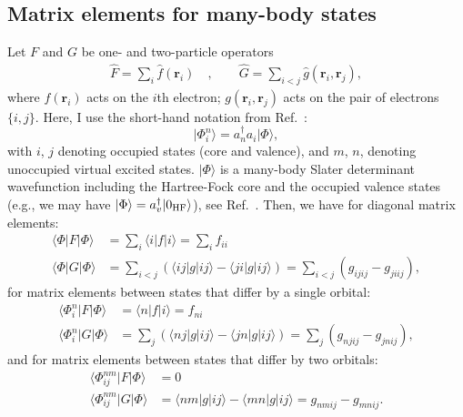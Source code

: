 \documentclass[10pt,twocolumn,a4paper]{article}%
\newcommand{\bra}[1]{\ensuremath{\langle #1|}}	%
\newcommand{\ket}[1]{\ensuremath{|#1\rangle}}
\renewcommand{\v}[1]{\ensuremath{\boldsymbol{#1}}}		%
\begin{document}
\subsection{Matrix elements for many-body states\label{sec:app-many-body-mes}}


Let $F$ and $G$ be one- and two-particle operators
\begin{align}
\hat F = \sum_i \hat f(\v{r}_i) \quad,\qquad
\hat G = \sum_{i<j} \hat g(\v{r}_i,\v{r}_j),
\end{align}
where $f(\v{r}_i)$ acts on the $i$th electron; $g(\v{r}_i,\v{r}_j)$ acts on the pair of electrons $\{i,j\}$.
Here, I use the short-hand notation from Ref.~\cite{Lindgren1986}:
\[
\ket{\Phi_i^n} = a_n^\dag a_i \ket{\Phi},
\]
with $i$, $j$ denoting occupied states (core and valence), and $m$, $n$, denoting unoccupied virtual excited states.
$\ket{\Phi}$ is a many-body Slater determinant wavefunction including the Hartree-Fock core and the occupied valence states (e.g., we may have $\ket{\Phi} = a_v^\dag\ket{0_{\rm HF}}$), see Ref.~\cite{Lindgren1986}.
Then, we have for diagonal matrix elements:
\begin{equation}\begin{split}
\bra{\Phi}F\ket{\Phi} &= \sum_i \bra{i}f\ket{i}  = \sum_i f_{ii}\\
\bra{\Phi}G\ket{\Phi} &= \sum_{i<j} \left( \bra{ij}g\ket{ij} - \bra{ji}g\ket{ij} \right) = \sum_{i<j} (g_{ijij}-g_{jiij}),
\end{split}\end{equation}
for matrix elements between states that differ by a single orbital:
\begin{equation}\begin{split}
\bra{\Phi^n_i}F\ket{\Phi} &=  \bra{n}f\ket{i}  = f_{ni}\\
\bra{\Phi^n_i}G\ket{\Phi} &= \sum_{j} \left( \bra{nj}g\ket{ij} - \bra{jn}g\ket{ij} \right)  = \sum_{j} (g_{njij}-g_{jnij}) ,
\end{split}\end{equation}
and for matrix elements between states that differ by two orbitals:
\begin{equation}\begin{split}\label{eq:G-twobody}
\bra{\Phi^{nm}_{ij}}F\ket{\Phi} &=  0 \\
\bra{\Phi^{nm}_{ij}}G\ket{\Phi} &= \bra{nm}g\ket{ij} - \bra{mn}g\ket{ij} = g_{nmij}-g_{mnij}.
\end{split}\end{equation}
\end{document}
